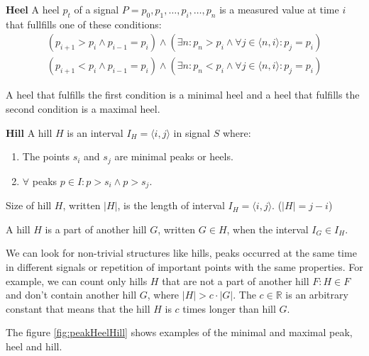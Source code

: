 \begin{definition}{\textbf{Heel}}
    A heel $p_t$ of a signal $P = {p_0, p_1, \dots, p_i, \dots, p_n}$ is a measured value at time $i$ that fullfills one of these conditions:
    \begin{eqnarray}
    (p_{i+1} > p_i \land p_{i-1} = p_i) \land (\exists n : p_n > p_i \land \forall j \in \langle n, i \rangle : p_j = p_i) \\
    (p_{i+1} < p_i \land p_{i-1} = p_i) \land (\exists n : p_n < p_i \land \forall j \in \langle n, i \rangle : p_j = p_i)
    \end{eqnarray}
    
    A heel that fulfills the first condition is a minimal heel and a heel that fulfills the second condition is a maximal heel.
\end{definition}

\begin{definition}{\textbf{Hill}}
    \label{def:hill}
    A hill $H$ is an interval $I_H = \langle i,j \rangle$ in signal $S$ where:
    \begin{enumerate}
        \item The points $s_i$ and $s_j$ are minimal peaks or heels.
        \item $\forall$ peaks $p \in I : p > s_i \land p > s_j$.
    \end{enumerate}
\end{definition}

\begin{remark}
    Size of hill $H$, written $|H|$, is the length of interval $I_H = \langle i,j \rangle$. ($|H| = j - i$)
\end{remark}

\begin{remark}
    A hill $H$ is a part of another hill $G$, written $G \in H$, when the interval $I_G \in I_H$.
\end{remark}

We can look for non-trivial structures like hills, peaks occurred at the same time in different signals or repetition of important points with the same properties. For example, we can count only hills $H$ that are not a part of another hill $F : H \in F$ and don't contain another hill $G$, where $|H| > c \cdot |G|$. The $c \in \mathbb{R}$ is an arbitrary constant that means that the hill $H$ is $c$ times longer than hill $G$.

The figure \ref{fig:peakHeelHill} shows examples of the minimal and maximal peak, heel and hill.

